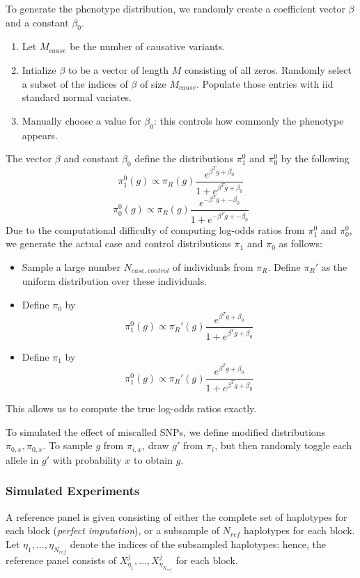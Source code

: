 \documentclass[12pt]{article}
\begin{document}
To generate the phenotype distribution, we randomly create
a coefficient vector $\beta$ and a constant $\beta_0$.
\begin{enumerate}
\item Let $M_{cause}$ be the number of causative variants.
\item Intialize $\beta$ to be a vector of length $M$ consisting of all
  zeros.
Randomly select a subset of the indices of $\beta$ of size
$M_{cause}$.
Populate those entries with iid standard normal variates.
\item Manually choose a value for $\beta_0$: this controls
how commonly the phenotype appears.
\end{enumerate}

The vector $\beta$ and constant $\beta_0$ define the
distributions $\pi_1^0$ and $\pi_0^0$ by the following
\[
\pi_1^0(g) \propto \pi_R(g) \frac{e^{\beta^T g + \beta_0}}{1 + e^{\beta^T g + \beta_0}} 
\]
\[
\pi_0^0(g) \propto \pi_R(g) \frac{e^{-\beta^T g + -\beta_0}}{1 + e^{-\beta^T g + -\beta_0}} 
\]
Due to the computational difficulty of computing log-odds ratios
from $\pi_1^0$ and $\pi_0^0$,
we generate the actual case and control distributions $\pi_1$ and
$\pi_0$ as follows:
\begin{itemize}
\item Sample a large number $N_{case,control}$ of individuals from $\pi_R$.
Define $\pi_R'$ as the uniform distribution over these individuals.
\item Define $\pi_0$ by
\[
\pi_1^0(g) \propto \pi_R'(g) \frac{e^{\beta^T g + \beta_0}}{1 + e^{\beta^T g + \beta_0}}
\]
\item Define $\pi_1$ by
\[
\pi_1^0(g) \propto \pi_R'(g) \frac{e^{\beta^T g + \beta_0}}{1 + e^{\beta^T g + \beta_0}}
\]
\end{itemize}
This allows us to compute the true log-odds ratios exactly.

To simulated the effect of miscalled SNPs,
we define modified distributions $\pi_{0,x}, \pi_{0,x}$.
To sample $g$ from $\pi_{i,x}$, draw $g'$ from $\pi_i$,
but then randomly toggle each allele in $g'$ with probability $x$
to obtain $g$.

\subsubsection{Simulated Experiments}

A reference panel is given consisting of either the complete set of
haplotypes for each block (\emph{perfect imputation}), or a subsample
of $N_{ref}$ haplotypes for each block.
Let $\eta_1,\hdots,\eta_{N_{ref}}$ denote the indices of the
subsampled haplotypes:
hence, the reference panel consists of
$X^j_{\eta_1},\hdots,X^j_{\eta_{N_{ref}}}$
for each block.
\end{document}

